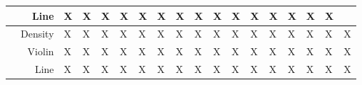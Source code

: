 \begin{table}[!tbp]
\begin{tabular}{|cr|p{2.2mm}|p{2.2mm}|p{2.2mm}|p{2.2mm}|p{2.2mm}|p{2.2mm}|p{2.2mm}|p{2.2mm}|p{2.2mm}|p{2.2mm}|p{2.2mm}|p{2.2mm}|p{2.2mm}|p{2.2mm}|p{2.2mm}|p{2.2mm}|}
		\multicolumn{1}{|r|}{}                                       & Line                                  & X                                 & X                                 & X                                         & X                                   & X                                 & X                            & X                                      & X                                                    & X                                     & X                                  & X                                    & X                              & X                                      & X                          & X                             &   \\ \hline
		\multicolumn{1}{|c|}{\multirow{3}{*}{\rotatebox{90}{Agent}}} & Density                               & X                                 & X                                 & X                                         & X                                   & X                                 & X                            & X                                      & X                                                    & X                                     & X                                  & X                                    & X                              & X                                      & X                          & X                             & X \\ \cline{2-18}
		\multicolumn{1}{|r|}{}                                       & Violin                                & X                                 & X                                 & X                                         & X                                   & X                                 & X                            & X                                      & X                                                    & X                                     & X                                  & X                                    & X                              & X                                      & X                          & X                             & X \\ \cline{2-18}
		\multicolumn{1}{|r|}{}                                       & Line                                  & X                                 & X                                 & X                                         & X                                   & X                                 & X                            & X                                      & X                                                    & X                                     & X                                  & X                                    & X                              & X                                      & X                          & X                             & X \\ \hline

\end{tabular}
\end{table}
